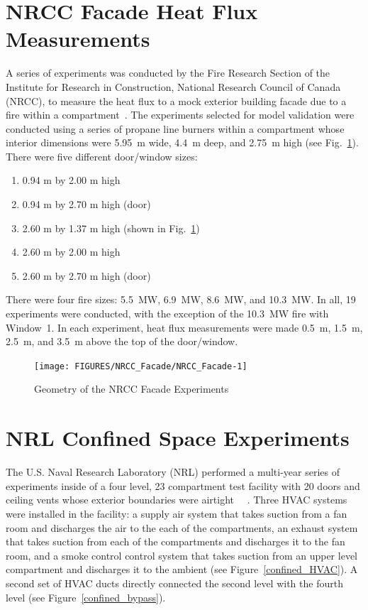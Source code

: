 \section{NRCC Facade Heat Flux Measurements}

A series of experiments was conducted by the Fire Research Section of the Institute for Research in Construction, National Research Council of Canada (NRCC),
to measure the heat flux to a mock exterior building facade due to a fire within a compartment~\cite{Oleszkiewicz:ASME,Oleszkiewicz:FireTech}. The experiments selected for model
validation were conducted using a series of propane line burners within a compartment whose interior dimensions were 5.95~m wide, 4.4~m deep, and 2.75~m high (see
Fig.~\ref{NRCC_Facade_Drawing}). There
were five different door/window sizes:
\begin{enumerate}
\item 0.94 m by 2.00 m high
\item 0.94 m by 2.70 m high (door)
\item 2.60 m by 1.37 m high (shown in Fig.~\ref{NRCC_Facade_Drawing})
\item 2.60 m by 2.00 m high
\item 2.60 m by 2.70 m high (door)
\end{enumerate}
There were four fire sizes: 5.5~MW, 6.9~MW, 8.6~MW, and 10.3~MW. In all, 19 experiments were conducted, with the exception of the 10.3~MW fire with Window~1. In each
experiment, heat flux measurements were made 0.5~m, 1.5~m, 2.5~m, and 3.5~m above the top of the door/window.

\begin{figure}
\begin{center}
\texttt{[image: FIGURES/NRCC\_Facade/NRCC\_Facade-1]}
\end{center}
\caption{Geometry of the NRCC Facade Experiments}
\label{NRCC_Facade_Drawing}
\end{figure}


\clearpage

\section{NRL Confined Space Experiments}

The U.S. Naval Research Laboratory (NRL) performed a multi-year series of experiments inside of a four level,
23 compartment test facility with 20 doors and ceiling vents whose exterior boundaries were airtight~\cite{Confined_JFPE} ~\cite{Confined_DTIC}.
Three HVAC systems were installed in the facility: a supply air system that takes suction from a fan room and discharges the air to the each of the compartments,
an exhaust system that takes suction from each of the compartments and discharges it to the fan room, and a smoke control control system that takes suction from an upper
level compartment and discharges it to the ambient (see Figure~\ref{confined_HVAC}).
A second set of HVAC ducts directly connected the second level with the fourth level (see Figure~\ref{confined_bypass}).


